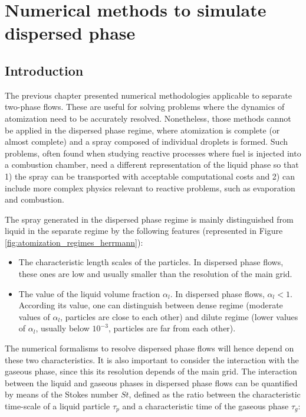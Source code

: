\chapter{Numerical methods to simulate dispersed phase}
	\label{ch3:disperse_phase_methods}

\section{Introduction}

The previous chapter presented numerical methodologies applicable to separate two-phase flows. These are useful for solving problems where the dynamics of atomization need to be accurately resolved. Nonetheless, those methods cannot be applied in the dispersed phase regime, where atomization is complete (or almost complete) and a spray composed of individual droplets is formed. Such problems, often found when studying reactive processes where fuel is injected into a combustion chamber, need a different representation of the liquid phase so that 1) the spray can be transported with acceptable computational costs and 2) can include more complex physics relevant to reactive problems, such as evaporation and combustion.

The spray generated in the dispersed phase regime is mainly distinguished from liquid in the separate regime by the following features (represented in Figure \ref{fig:atomization_regimes_herrmann}):

\begin{itemize}

	\item The characteristic length scales of the particles. In dispersed phase flows, these ones are low and usually smaller than the resolution of the main grid.
	
	\item The value of the liquid volume fraction $\alpha_l$. In dispersed phase flows, $\alpha_l < 1$. According its value, one can distinguish between dense regime (moderate values of $\alpha_l$, particles are close to each other) and dilute regime (lower values of $\alpha_l$, usually below $10^{-3}$, particles are far from each other).

\end{itemize}

The numerical formalisms to resolve dispersed phase flows will hence depend on these two characteristics. It is also important to consider the interaction with the gaseous phase, since this its resolution depends of the main grid. The interaction between the liquid and gaseous phases in dispersed phase flows can be quantified by means of the Stokes number $St$, defined as the ratio between the characteristic time-scale of a liquid particle $\tau_p$ and a characteristic time of the gaseous phase $\tau_g$: 

